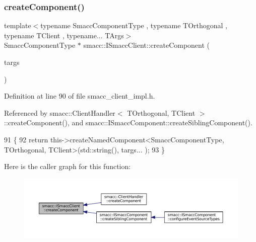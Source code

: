 \subsubsection{\texorpdfstring{create\+Component()}{createComponent()}}
{\footnotesize\ttfamily template$<$typename Smacc\+Component\+Type , typename T\+Orthogonal , typename T\+Client , typename... T\+Args$>$ \\
Smacc\+Component\+Type $\ast$ smacc\+::\+I\+Smacc\+Client\+::create\+Component (\begin{DoxyParamCaption}\item[{T\+Args...}]{targs }\end{DoxyParamCaption})\hspace{0.3cm}{\ttfamily [protected]}}



Definition at line 90 of file smacc\+\_\+client\+\_\+impl.\+h.



Referenced by smacc\+::\+Client\+Handler$<$ T\+Orthogonal, T\+Client $>$\+::create\+Component(), and smacc\+::\+I\+Smacc\+Component\+::create\+Sibling\+Component().


\begin{DoxyCode}
91     \{
92         \textcolor{keywordflow}{return} this->createNamedComponent<SmaccComponentType, TOrthogonal, TClient>(std::string(), targs...
      );
93     \}
\end{DoxyCode}
Here is the caller graph for this function\+:
\nopagebreak
\begin{figure}[H]
\begin{center}
\leavevmode
\includegraphics[width=350pt]{classsmacc_1_1ISmaccClient_a5c1c8eb5e91a3b399662a52cb0ca86aa_icgraph}
\end{center}
\end{figure}
\mbox{\label{classsmacc_1_1ISmaccClient_affcc2f95bc993b5f07ef0d6ab6eec8f1}} 
